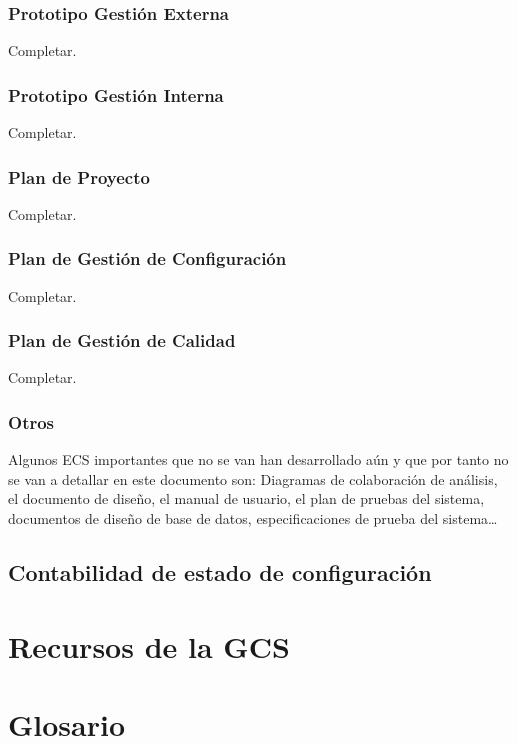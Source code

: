 \documentclass[11pt, a4paper, twoside, titlepage]{article}
\begin{document}
			\subsubsection{Prototipo Gestión Externa}
				Completar.

			\subsubsection{Prototipo Gestión Interna}
				Completar.

			\subsubsection{Plan de Proyecto}
				Completar.

			\subsubsection{Plan de Gestión de Configuración}
				Completar.

			\subsubsection{Plan de Gestión de Calidad}
				Completar.

			\subsubsection{Otros}
				Algunos ECS importantes que no se van han desarrollado aún y que por tanto no se van a detallar en este documento son: Diagramas de colaboración de análisis, el documento de diseño, el manual de usuario, el plan de pruebas del sistema, documentos de diseño de base de datos, especificaciones de prueba del sistema\ldots

		\subsection{Contabilidad de estado de configuración} %
	\section{Recursos de la GCS} %
	\section{Glosario}
		\printglossaries

	\newpage
	
	
\end{document}
